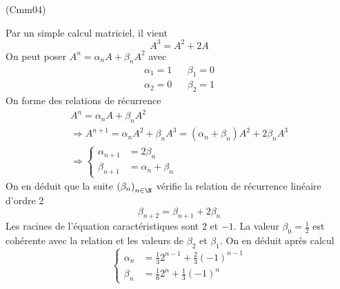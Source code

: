 \begin{tiny}(Cmm04)\end{tiny} Par un simple calcul matriciel, il vient
\begin{displaymath}
 A^3 = A^2 + 2A
\end{displaymath}
On peut poser $A^n=\alpha_n A + \beta_n A^2$ avec
\[
\begin{aligned}
 \alpha_1 = 1& & \beta_1=0\\ \alpha_2 = 0& & \beta_2=1 
\end{aligned}
\]
On forme des relations de récurrence
\begin{multline*}
 A^n=\alpha_n A + \beta_n A^2\\ \Rightarrow
 A^{n+1}=\alpha_n A^2 + \beta_n A^3
= (\alpha_n +\beta_n)A^2 +2\beta_n A^3\\
\Rightarrow
\left\lbrace 
\begin{aligned}
\alpha_{n+1}&= 2\beta_n\\\beta_{n+1}&=\alpha_n + \beta_n 
\end{aligned}
\right. 
\end{multline*}
On en déduit que la suite $\left( \beta_n\right) _{n\in \N}$ vérifie la relation de récurrence linéaire d'ordre 2
\begin{displaymath}
 \beta_{n+2} = \beta_{n+1} + 2\beta_n
\end{displaymath}
Les racines de l'équation caractéristiques sont $2$ et $-1$. La valeur $\beta_0=\frac{1}{2}$ est cohérente avec la relation et les valeurs de $\beta_2$ et $\beta_1$. On en déduit après calcul 
\begin{displaymath}
 \left\lbrace 
\begin{aligned}
 \alpha_n &= \frac{1}{3}2^{n-1} + \frac{2}{3}(-1)^{n-1}\\
 \beta_n &= \frac{1}{6}2^n + \frac{1}{3}(-1)^n
\end{aligned}
\right. 
\end{displaymath}

